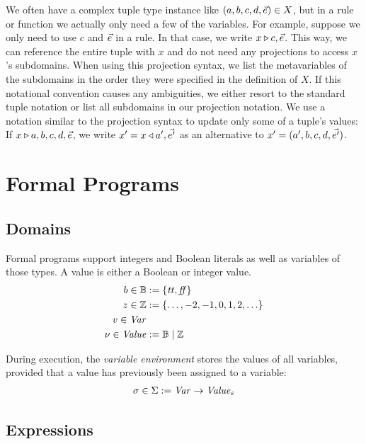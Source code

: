 \documentclass{article}
\begin{document}
	We often have a complex tuple type instance like $(a, b, c, d, \vec{e}) \in X$, but in a rule or
	function we actually only need a few of the variables. For example, suppose we only need to use $c$ and $\vec{e}$ in a rule. In that case,
	we write $x \triangleright c, \vec{e}$.
	This way, we can reference the entire tuple with $x$ and do not need any projections to access $x$'s subdomains. When using this projection syntax, we list the
	metavariables of the subdomains in the order they were specified in the definition of $X$. If this notational convention causes any ambiguities, we either
	resort to the standard tuple notation or list all subdomains in our projection notation. We use a notation similar to the
	projection syntax to update only some of a tuple's values: If $x \triangleright a, b, c, d, \vec{e}$, we write $x' = x
	\triangleleft a', \vec{e'}$ as an alternative to $x' = (a', b, c, d, \vec{e'})$.  

\section{Formal Programs}

\subsection{Domains}

Formal programs support integers and Boolean literals as well as variables of those types. A value is either a Boolean or integer
value.
\begin{align*}
    b \in \mathbb{B} &:= \{ \mathit{tt}, \mathit{ff} \}
    \\
    z \in \mathbb{Z} &:= \{ \ldots, -2, -1, 0, 1, 2, \ldots \}
    \\
    v \in \mathit{Var}
    \\
    \nu \in \mathit{Value} &:= \mathbb{B} \mid \mathbb{Z}
\end{align*}

During execution, the \textit{variable environment} stores the values of all variables, provided that a value has previously been
assigned to a variable:
\begin{align*}
	\sigma \in \Sigma := \mathit{Var} \rightarrow \mathit{Value}_\varepsilon
\end{align*}

\subsection{Expressions}
\end{document}
